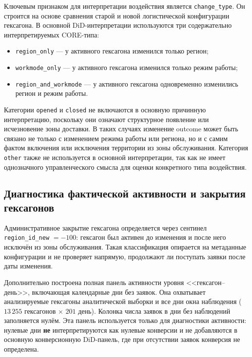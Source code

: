 \documentclass[14pt,a4paper]{extarticle}
\begin{document}
Ключевым признаком для интерпретации воздействия является \texttt{change\_type}. Он строится на основе сравнения старой и новой логистической конфигурации гексагона. В основной DiD-интерпретации используются три содержательно интерпретируемых CORE-типа:

\begin{itemize}
    \item \texttt{region\_only} --- у активного гексагона изменился только регион;
    \item \texttt{workmode\_only} --- у активного гексагона изменился только режим работы;
    \item \texttt{region\_and\_workmode} --- у активного гексагона одновременно изменились регион и режим работы.
\end{itemize}

Категории \texttt{opened} и \texttt{closed} не включаются в основную причинную интерпретацию, поскольку они означают структурное появление или исчезновение зоны доставки. В таких случаях изменение outcome может быть связано не только с изменением режима работы или региона, но и с самим фактом включения или исключения территории из зоны обслуживания. Категория \texttt{other} также не используется в основной интерпретации, так как не имеет однозначного управленческого смысла для оценки конкретного типа воздействия.

\subsection{Диагностика фактической активности и закрытия гексагонов}
\label{subsec:hex_activity_closure_diagnostics}

Административное закрытие гексагона определяется через сентинел \texttt{region\_id\_new} \(= -100\): гексагон был активен до изменения и после него исключён из зоны обслуживания. Такая классификация опирается на метаданные конфигурации и не проверяет напрямую, продолжают ли поступать заявки после даты изменения.

Дополнительно построена полная панель активности уровня <<гексагон--день>>, включающая календарные дни без заявок. Она охватывает анализируемые гексагоны аналитической выборки и все дни окна наблюдения (\(13\,255\) гексагонов \(\times\) \(201\) день). Колонка числа заявок в дни без наблюдений заполняется нулём. Эта панель используется только для диагностики активности: нулевые дни \textbf{не} интерпретируются как нулевые конверсии и не добавляются в основную конверсионную DiD-панель, где при отсутствии заявок конверсия не определена.
\end{document}
